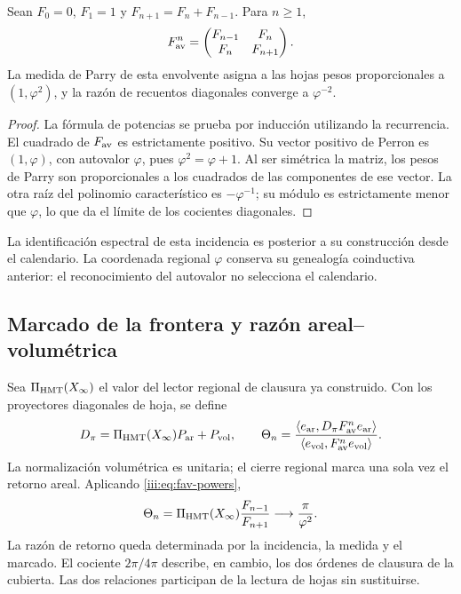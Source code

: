\begin{proposition}
Sean $F_0=0$, $F_1=1$ y $F_{n+1}=F_n+F_{n-1}$. Para $n\geq1$,
\begin{equation}
 F_{\rm av}^{n}=
 \begin{pmatrix}F_{n-1}&F_n\\F_n&F_{n+1}\end{pmatrix}.
 \label{iii:eq:fav-powers}
\end{equation}
La medida de Parry de esta envolvente asigna a las hojas pesos proporcionales
a $(1,\varphi^2)$, y la razón de recuentos diagonales converge a $\varphi^{-2}$.
\end{proposition}
\begin{proof}
La fórmula de potencias se prueba por inducción utilizando la recurrencia.
El cuadrado de $F_{\rm av}$ es estrictamente positivo. Su vector positivo de
Perron es $(1,\varphi)$, con autovalor $\varphi$, pues
$\varphi^2=\varphi+1$. Al ser simétrica la matriz, los pesos de Parry son
proporcionales a los cuadrados de las componentes de ese vector. La otra raíz
del polinomio característico es $-\varphi^{-1}$; su módulo es estrictamente
menor que $\varphi$, lo que da el límite de los cocientes diagonales.
\end{proof}

La identificación espectral de esta incidencia es posterior a su construcción
desde el calendario. La coordenada regional $\varphi$ conserva su genealogía
coinductiva anterior: el reconocimiento del autovalor no selecciona el calendario.

\subsection{Marcado de la frontera y razón areal--volumétrica}

Sea $\Pi_{\rm HMT}(X_\infty)$ el valor del lector regional de clausura ya
construido. Con los proyectores diagonales de hoja, se define
\begin{equation}
 D_\pi=\Pi_{\rm HMT}(X_\infty)P_{\rm ar}+P_{\rm vol},\qquad
 \Theta_n=
 \frac{\langle e_{\rm ar},D_\pi F_{\rm av}^{n}e_{\rm ar}\rangle}
 {\langle e_{\rm vol},F_{\rm av}^{n}e_{\rm vol}\rangle}.
 \label{iii:eq:marked-return}
\end{equation}
La normalización volumétrica es unitaria; el cierre regional marca una sola vez
el retorno areal. Aplicando \eqref{iii:eq:fav-powers},
\begin{equation}
 \Theta_n=\Pi_{\rm HMT}(X_\infty)\frac{F_{n-1}}{F_{n+1}}
 \longrightarrow\frac{\pi}{\varphi^2}.
 \label{iii:eq:av-limit}
\end{equation}
La razón de retorno queda determinada por la incidencia, la medida y el marcado.
El cociente $2\pi/4\pi$ describe, en cambio, los dos órdenes de clausura de la
cubierta. Las dos relaciones participan de la lectura de hojas sin sustituirse.

